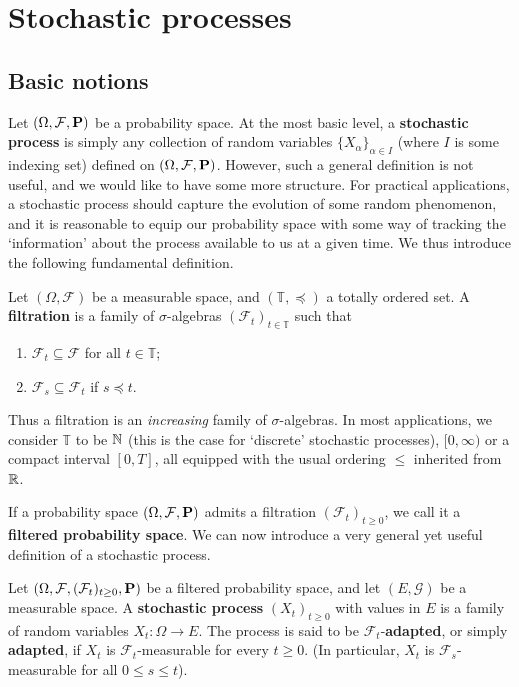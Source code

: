 \section{Stochastic processes}

\subsection{Basic notions}
Let $(\Omega, \mathcal{F}, \mathbf{P})$ be a probability space. At the most basic level, a \textbf{stochastic process} is simply any collection of random variables $\{X_\alpha\}_{\alpha \in I}$ (where $I$ is some indexing set) defined on $(\Omega, \mathcal{F}, \mathbf{P})$. However, such a general definition is not useful, and we would like to have some more structure. For practical applications, a stochastic process should capture the evolution of some random phenomenon, and it is reasonable to equip our probability space with some way of tracking the `information' about the process available to us at a given time. We thus introduce the following fundamental definition.

\begin{definition}
Let $(\Omega, \mathcal{F})$ be a measurable space, and $(\mathbb{T}, \preceq)$ a totally ordered set. A \textbf{filtration} is a family of $\sigma$-algebras $(\mathcal{F}_t)_{t \in\mathbb{T}}$ such that
\begin{enumerate}[\upshape (i)]
    \item $\mathcal{F}_t\subseteq\mathcal{F}$ for all $t\in\mathbb{T}$;
    \item $\mathcal{F}_s \subseteq\mathcal{F}_t$ if $s \preceq t$.
\end{enumerate}
\end{definition}
Thus a filtration is an \emph{increasing} family of $\sigma$-algebras. In most applications, we consider $\mathbb{T}$ to be $\mathbb{N}$ (this is the case for `discrete' stochastic processes), $[0, \infty)$ or a compact interval $[0, T]$, all equipped with the usual ordering $\le$ inherited from $\mathbb{R}$.

If a probability space $(\Omega,\mathcal{F},\mathbf{P})$ admits a filtration $(\mathcal{F}_t)_{t\ge 0}$, we call it a \textbf{filtered probability space}. We can now introduce a very general yet useful definition of a stochastic process.
\begin{definition}
    Let $(\Omega, \mathcal{F}, (\mathcal{F}_t)_{t\ge 0}, \mathbf{P})$ be a filtered probability space, and let $(E,\mathcal{G})$ be a measurable space. A \textbf{stochastic process} $(X_t)_{t \ge 0}$ with values in $E$ is a family of random variables $X_t :\Omega\to E$. The process is said to be $\mathcal{F}_t$-\textbf{adapted}, or simply \textbf{adapted}, if $X_t$ is $\mathcal{F}_t$-measurable for every $t \ge 0$. (In particular, $X_t$ is $\mathcal{F}_s$-measurable for all $0 \le s \le t$).
\end{definition}

